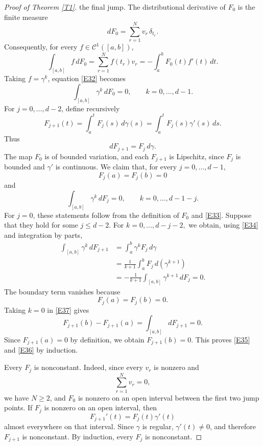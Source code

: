 \documentclass[reqno]{amsart}
\theoremstyle{definition}
\newcommand{\cC}{\mathcal{C}}
\numberwithin{equation}{section}
\begin{document}
\begin{proof}[Proof of Theorem \ref{T1}]
the final jump. The distributional derivative of $F_0$ is the finite measure
\[dF_0=\sum_{r=1}^N v_r\,\delta_{t_r}.\]
Consequently, for every $f\in \cC^1([a,b])$,
\[\int_{[a,b]} f\,dF_0=\sum_{r=1}^N f(t_r)v_r=-\int_a^b F_0(t)f'(t)\,dt.\]
Taking $f=\gamma^k$, equation
\eqref{E32} becomes
\begin{equation}
    \int_{[a,b]}\gamma^k\,dF_0=0,
    \qquad
    k=0,\ldots,d-1.
    \label{E33}
\end{equation}
For $j=0,\ldots,d-2$, define recursively
\begin{equation} F_{j+1}(t)=\int_a^t F_j(s)\,d\gamma(s)=\int_a^t F_j(s)\gamma'(s)\,ds.
    \label{E34}
\end{equation}
Thus
\[
    dF_{j+1}=F_j\,d\gamma.
\]
The map $F_0$ is of bounded variation, and each $F_{j+1}$ is
Lipschitz, since $F_j$ is bounded and $\gamma'$ is continuous.
We claim that, for every $j=0,\ldots,d-1$,
\begin{equation}
    F_j(a)=F_j(b)=0
    \label{E35}
\end{equation}
and
\begin{equation}
    \int_{[a,b]}\gamma^k\,dF_j=0,
    \qquad
    k=0,\ldots,d-1-j.
    \label{E36}
\end{equation}
For $j=0$, these statements follow from the definition of $F_0$ and \eqref{E33}. Suppose that they hold for some $j\leq d-2$. For $k=0,\ldots,d-j-2,$ we obtain, using \eqref{E34} and integration by parts,
\begin{align}
    \int_{[a,b]}\gamma^k\,dF_{j+1}
    &=\int_a^b \gamma^k F_j\,d\gamma\nonumber\\
    &=\frac{1}{k+1}
    \int_a^b F_j\,d(\gamma^{k+1})\nonumber\\
    &=-\frac{1}{k+1}\int_{[a,b]}\gamma^{k+1}\,dF_j
    =0.
    \label{E37}
\end{align}
The boundary term vanishes because
\[F_j(a)=F_j(b)=0.\]
Taking $k=0$ in \eqref{E37} gives
\[F_{j+1}(b)-F_{j+1}(a)=\int_{[a,b]}dF_{j+1}=0.\]
Since $F_{j+1}(a)=0$ by definition, we obtain $F_{j+1}(b)=0$. This proves \eqref{E35} and \eqref{E36} by induction.

Every $F_j$ is nonconstant. Indeed, since every $v_r$ is nonzero and
\[\sum_{r=1}^N v_r=0,\]
we have $N\geq2$, and $F_0$ is nonzero on an open interval between
the first two jump points. If $F_j$ is nonzero on an open interval,
then
\[F_{j+1}'(t)=F_j(t)\gamma'(t)\]
almost everywhere on that interval. Since $\gamma$ is regular,
$\gamma'(t)\neq0$, and therefore $F_{j+1}$ is nonconstant. By
induction, every $F_j$ is nonconstant.


\end{proof}
\end{document}

